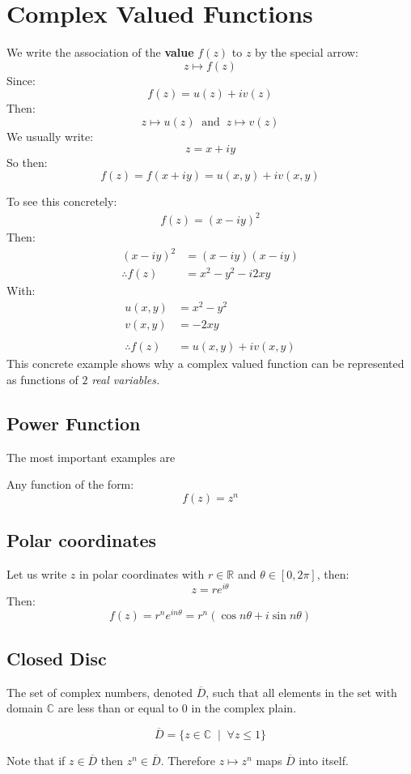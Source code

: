 \section{Complex Valued Functions}
We write the association of the \textbf{value} $f(z)$ to $z$ by the special arrow:
\[z \mapsto f(z) \]
Since:
\[f(z) = u(z) +iv(z)\]
Then:
\[z \mapsto u(z) \;\; \text{and} \;\;  z \mapsto v(z) \]
We usually write:
\[z = x + iy\]
So then:
\[f(z) = f(x + iy) = u(x,y) + iv(x,y)\]

To see this concretely:
\begin{align*}
	f(z) = (x - iy)^2
\end{align*}
Then:
\begin{align*}
	(x - iy)^2 &= (x - iy)(x - iy) \\
	\therefore f(z) &= x^2 - y^2 - i2xy
\end{align*}
With:
\begin{align*}
	u(x, y) &= x^2 - y^2 \\
	v(x, y) &= -2xy \\
	\\
	\therefore f(z) &= u(x, y) + iv(x, y)
\end{align*}
This concrete example shows why a complex valued function can be represented as functions of $2$ \textit{real variables.} 


\subsection{Power Function}
The most important examples are 
\begin{defn}
Any function of the form:
	\[f(z) = z^n\]
\end{defn}

\subsection{Polar coordinates}
Let us write $z$ in polar coordinates with $r \in \mathbb{R}$ and $\theta \in [0, 2\pi]$, then:
\[ z = re^{i\theta}\]
Then:
\[f(z) = r^ne^{in\theta} = r^n(\cos{n\theta} + i\sin{n\theta})\]

\subsection{Closed Disc}
The set of complex numbers, denoted $\overline{D}$, such that all elements in the set with domain $\mathbb{C}$ are less than or equal to $0$ in the complex plain.
\begin{defn}
	\[\overline{D} = \{z \in \mathbb{C} \;\;|\;\; \forall z \leq 1 \} \]
\end{defn}
Note that if $z \in \overline{D}$ then $z^n \in \overline{D}$. Therefore $z \mapsto z^n$ maps $\overline{D}$ into itself.

